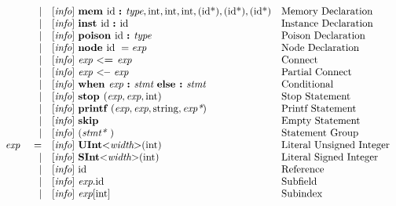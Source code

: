 \documentclass[12pt]{article}
\begin{document}
{\[\begin{array}{rrll}
                &\vert &[\text{\em info}]\  \text{\bf mem\ } \text{id } \text{\bf :\ } \text{\em type}, 
                        \text{int},\text{int},\text{int},(\text{id*}),(\text{id*}),(\text{id*})                                     &\text{Memory Declaration}\\
                &\vert &[\text{\em info}]\  \text{\bf inst\ } \text{id } \text{\bf :\ } \text{id }                                                &\text{Instance Declaration}\\
                &\vert &[\text{\em info}]\  \text{\bf poison\ } \text{id } \text{\bf :\ } \text{\em type}                                       &\text{Poison Declaration}\\
                &\vert &[\text{\em info}]\  \text{\bf node\ } \text{id }  = \text{\em exp\ }                                               &\text{Node Declaration}\\
                &\vert &[\text{\em info}]\  \text{\em exp\ } \text{\bf $<$=\ } \text{\em exp\ }                                             &\text{Connect}\\
                &\vert &[\text{\em info}]\  \text{\em exp\ } \text{\bf $<$--\ } \text{\em exp\ }                                            &\text{Partial Connect}\\
                &\vert &[\text{\em info}]\  \text{\bf when\ } \text{\em exp\ } \text{\bf :\ } \text{\em stmt\ } \text{\bf else :\ } \text{\em stmt\ }               &\text{Conditional}\\
                &\vert &[\text{\em info}]\  \text{\bf stop\ }(\text{\em exp},\text{\em exp},\text{int})                                    &\text{Stop Statement}\\
                &\vert &[\text{\em info}]\  \text{\bf printf\ }(\text{\em exp},\text{\em exp},\text{string},\text{\em exp*})                    &\text{Printf Statement}\\
                &\vert &[\text{\em info}]\  \text{\bf skip\ }                                                               &\text{Empty Statement}\\
                &\vert &[\text{\em info}]\  (\text{\em stmt*\ })                                                            &\text{Statement Group}\\
\text{\em exp\ }        &=     &[\text{\em info}]\  \text{\bf UInt} \text{\bf $<$} \text{\em width} \text{\bf $>$}(\text{int})                       &\text{Literal Unsigned Integer}\\
                &\vert &[\text{\em info}]\  \text{\bf SInt} \text{\bf $<$} \text{\em width} \text{\bf $>$}(\text{int})                       &\text{Literal Signed Integer}\\
                &\vert &[\text{\em info}]\  \text{id }                                                                     &\text{Reference}\\
                &\vert &[\text{\em info}]\  \text{\em exp}.\text{id }                                                           &\text{Subfield}\\
                &\vert &[\text{\em info}]\  \text{\em exp}[\text{int}]                                                        &\text{Subindex}\\

\end{array}\]}
\end{document}

